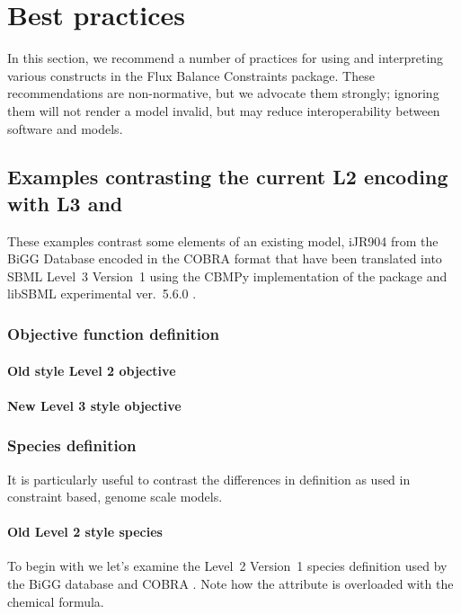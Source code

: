 
\section{Best practices}
\label{best-practices}

In this section, we recommend a number of practices for using and
interpreting various constructs in the Flux Balance Constraints package.
These recommendations are non-normative, but we advocate them strongly;
ignoring them will not render a model invalid, but may reduce
interoperability between software and models.

\subsection{Examples contrasting the current \SBML L2 encoding with L3 and \FBC}
These examples contrast some elements of an existing model, iJR904 from the \textsf{BiGG} Database encoded in the \textsf{COBRA} format \cite{ijr904, bigg, cobra} that have been translated into SBML Level~3 Version~1 using the \textsf{CBMPy} implementation of the \FBC package \cite{pysces, cbmpy} and \textsf{libSBML} experimental ver.~5.6.0 \cite{libsbml}.

\subsubsection*{Objective function definition}
\paragraph{Old style \SBML Level 2 objective}

\paragraph{New \SBML Level 3 style objective}
\protect{}

\newpage
\subsubsection*{Species definition}
It is particularly useful to contrast the differences in \Species definition as used in constraint based, genome scale models.

\paragraph{Old \SBML Level 2 style species}
To begin with we let's examine the \SBML Level~2 Version~1 species definition used by the BiGG database and \textsf{COBRA} \cite{bigg, cobra}. Note how the  attribute is overloaded with the chemical formula.
%

